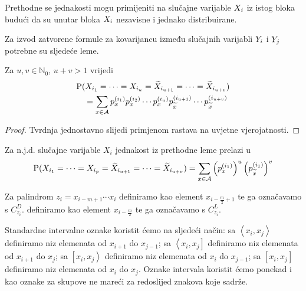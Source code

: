 Prethodne se jednakosti mogu primijeniti na slučajne varijable $\tsvar{X}_i$ iz
istog bloka budući da su unutar bloka $\tsvar{X}_i$ nezavisne i jednako distribuirane.

Za izvod zatvorene formule za kovarijancu između slučajnih varijabli
$\tsvar{Y}_i$ i $\tsvar{Y}_j$
potrebne su sljedeće leme.

\begin{lem} \label{pal:lem:mixvarijabli}
	Za $u,v \in \mathbb{N}_{0}$, $u+v>1$ vrijedi
	\begin{align}
		& \vP( \tsvar{X}_{i_1} = \cdots = \tsvar{X}_{i_u} 
		= \ol{\tsvar{X}}_{i_{u+1}} = \cdots
		= \ol{\tsvar{X}}_{i_{u+v}}) \nonumber \\
		& \hspace{1em}
		= \sum_{x \in \mathcal{A}}
		p_{x}^{(i_1)}
		p_x^{(i_2)}
		\cdots
		p_x^{(i_u)}
		p_{\ol{x}}^{(i_{u+1})}
		\cdots
		p_{\ol{x}}^{(i_{u+v})}
	\end{align}
\end{lem}
%
\begin{proof}
	Tvrdnja jednostavno slijedi primjenom rastava
	na uvjetne vjerojatnosti.
\end{proof}

\begin{napomena_} \label{pal:nap:njdmixvarijabli}
	Za n.j.d. slučajne varijable $X_i$ jednakost iz prethodne leme
	prelazi u
	\begin{equation}
		\vP (\tsvar{X}_{i_1} = \cdots = \tsvar{X}_{i_p} 
		= \ol{\tsvar{X}}_{i_{u+1}} = \cdots
		= \ol{\tsvar{X}}_{i_{u+v}}) 
		= \sum_{x \in \mathcal{A}}
		\left( p_{x}^{(i_1)} \right)^{u}
		\left( p_{\ol{x}}^{(i_1)} \right)^{v}
	\end{equation}
\end{napomena_}

\noindent
Za palindrom
$z_i = x_{i-m+1} \cdots x_{i}$ 
definiramo kao element $x_{i-\frac{m}{2}+1}$
te ga označavamo s $C_{z_i}^{D}$.
 definiramo kao element $x_{i-\frac{m}{2}}$
te ga označavamo s 
$C_{z_i}^{L}$.

Standardne intervalne oznake koristit ćemo na sljedeći
način: 
sa $\left<x_i,x_j\right>$ definiramo niz elemenata od $x_{i+1}$ do
$x_{j-1}$; 
sa $\left<x_i,x_j\right]$ definiramo niz elemenata od $x_{i+1}$ do
$x_{j}$; 
sa $\left[x_i,x_j\right>$ definiramo niz elemenata od $x_{i}$ do
$x_{j-1}$; 
sa $\left[x_i,x_j\right]$ definiramo niz elemenata od $x_{i}$ do
$x_{j}$. Oznake intervala koristit ćemo ponekad
i kao oznake za skupove ne mareći za redoslijed 
znakova koje sadrže.

